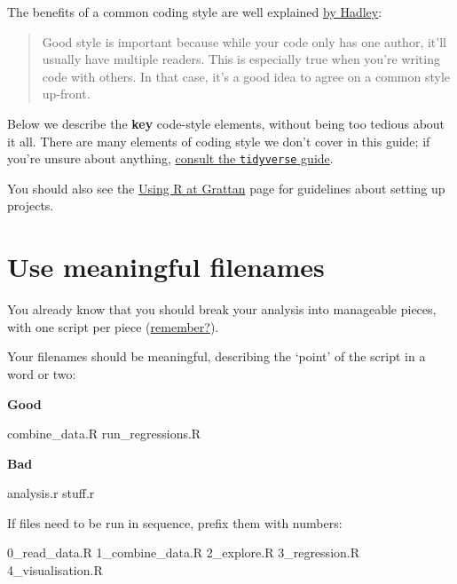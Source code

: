 \documentclass[]{book}
\newenvironment{Shaded}{\begin{snugshade}}{\end{snugshade}}
\newcommand{\DecValTok}[1]{\textcolor[rgb]{0.00,0.00,0.81}{#1}}
\newcommand{\NormalTok}[1]{#1}
\begin{document}
The benefits of a common coding style are well explained \href{http://r-pkgs.had.co.nz/style.html}{by Hadley}:

\begin{quote}
Good style is important because while your code only has one author, it'll usually have multiple readers. This is especially true when you're writing code with others. In that case, it's a good idea to agree on a common style up-front.
\end{quote}

Below we describe the \textbf{key} code-style elements, without being too tedious about it all. There are many elements of coding style we don't cover in this guide; if you're unsure about anything, \href{https://style.tidyverse.org/}{consult the \texttt{tidyverse} guide}.

You should also see the \protect\hyperlink{organising-projects}{Using R at Grattan} page for guidelines about setting up projects.

\hypertarget{use-meaningful-filenames}{%
\section{Use meaningful filenames}\label{use-meaningful-filenames}}

You already know that you should break your analysis into manageable pieces, with one script per piece (\protect\hyperlink{manageable}{remember?}).

Your filenames should be meaningful, describing the `point' of the script in a word or two:

\textbf{Good}

\begin{Shaded}
\begin{Highlighting}[]
\NormalTok{combine_data.R}
\NormalTok{run_regressions.R}
\end{Highlighting}
\end{Shaded}

\textbf{Bad}

\begin{Shaded}
\begin{Highlighting}[]
\NormalTok{analysis.r}
\NormalTok{stuff.r}
\end{Highlighting}
\end{Shaded}

If files need to be run in sequence, prefix them with numbers:

\begin{Shaded}
\begin{Highlighting}[]
\DecValTok{0}\NormalTok{_read_data.R}
\DecValTok{1}\NormalTok{_combine_data.R}
\DecValTok{2}\NormalTok{_explore.R}
\DecValTok{3}\NormalTok{_regression.R}
\DecValTok{4}\NormalTok{_visualisation.R}
\end{Highlighting}
\end{Shaded}
\end{document}

